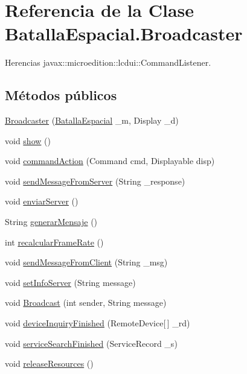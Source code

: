 \hypertarget{classBatallaEspacial_1_1Broadcaster}{
\section{Referencia de la Clase BatallaEspacial.Broadcaster}
\label{classBatallaEspacial_1_1Broadcaster}
}


Herencias javax::microedition::lcdui::CommandListener.

\subsection*{Métodos públicos}
\begin{DoxyCompactItemize}
\item 
\hyperlink{classBatallaEspacial_1_1Broadcaster_a424162f517b54271bb3a2061e5169ece}{Broadcaster} (\hyperlink{classBatallaEspacial_1_1BatallaEspacial}{BatallaEspacial} \_\-m, Display \_\-d)
\item 
void \hyperlink{classBatallaEspacial_1_1Broadcaster_a15841b652b0e618cafd5c4d1fd878f5f}{show} ()
\item 
void \hyperlink{classBatallaEspacial_1_1Broadcaster_ada3cd57d45bae2f435f41da542204416}{commandAction} (Command cmd, Displayable disp)
\item 
void \hyperlink{classBatallaEspacial_1_1Broadcaster_a2676c470d280526f4655b7770d12245b}{sendMessageFromServer} (String \_\-response)
\item 
void \hyperlink{classBatallaEspacial_1_1Broadcaster_ad7b5b5b6a2b074967b04406d9d2e4c97}{enviarServer} ()
\item 
String \hyperlink{classBatallaEspacial_1_1Broadcaster_a5202f4cdca2e7031311dcdc47d7dce73}{generarMensaje} ()
\item 
int \hyperlink{classBatallaEspacial_1_1Broadcaster_a5fbe1fc5364790302e75955fb6021e62}{recalcularFrameRate} ()
\item 
void \hyperlink{classBatallaEspacial_1_1Broadcaster_a7c062941953e1d1f750fa9e405943d17}{sendMessageFromClient} (String \_\-msg)
\item 
void \hyperlink{classBatallaEspacial_1_1Broadcaster_ad2be8560b5f31d97ef2344a79655e809}{setInfoServer} (String message)
\item 
void \hyperlink{classBatallaEspacial_1_1Broadcaster_aa1bddde2b5c8ddd17452c8175d84953c}{Broadcast} (int sender, String message)
\item 
void \hyperlink{classBatallaEspacial_1_1Broadcaster_af3058f3659449cb390ef399de6449000}{deviceInquiryFinished} (RemoteDevice\mbox{[}$\,$\mbox{]} \_\-rd)
\item 
void \hyperlink{classBatallaEspacial_1_1Broadcaster_a4a3a4c97f594460a76932efb8e85dfde}{serviceSearchFinished} (ServiceRecord \_\-s)
\item 
void \hyperlink{classBatallaEspacial_1_1Broadcaster_a8064ffd2079654513200827e34778456}{releaseResources} ()
\end{DoxyCompactItemize}
